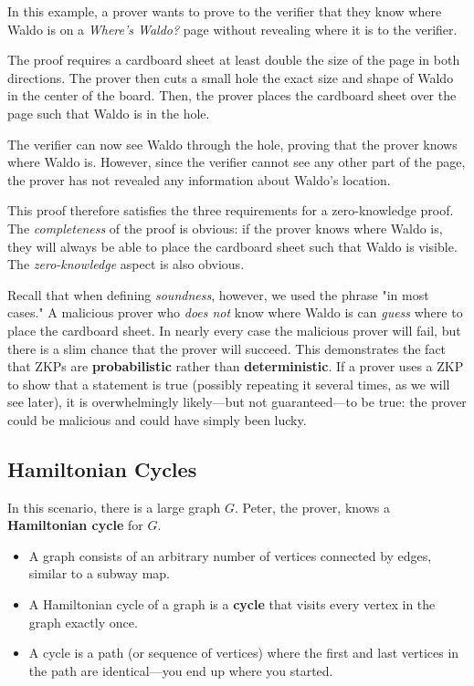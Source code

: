 \documentclass{article}
\begin{document}
\begin{multicols}{2}
In this example, a prover wants to prove to the verifier that they know where Waldo is on a \textit{Where's Waldo?} page without revealing where it is to the verifier.

The proof requires a cardboard sheet at least double the size of the page in both directions. The prover then cuts a small hole the exact size and shape of Waldo in the center of the board. Then, the prover places the cardboard sheet over the page such that Waldo is in the hole.

The verifier can now see Waldo through the hole, proving that the prover knows where Waldo is. However, since the verifier cannot see any other part of the page, the prover has not revealed any information about Waldo's location.

This proof therefore satisfies the three requirements for a zero-knowledge proof. The \textit{completeness} of the proof is obvious: if the prover knows where Waldo is, they will always be able to place the cardboard sheet such that Waldo is visible. The \textit{zero-knowledge} aspect is also obvious.

Recall that when defining \textit{soundness}, however, we used the phrase "in most cases." A malicious prover who \textit{does not} know where Waldo is can \textit{guess} where to place the cardboard sheet. In nearly every case the malicious prover will fail, but there is a slim chance that the prover will succeed. This demonstrates the fact that ZKPs are \textbf{probabilistic} rather than \textbf{deterministic}. If a prover uses a ZKP to show that a statement is true (possibly repeating it several times, as we will see later), it is overwhelmingly likely---but not guaranteed---to be true: the prover could be malicious and could have simply been lucky.

\subsection*{Hamiltonian Cycles}

In this scenario, there is a large graph $G$. Peter, the prover, knows a \textbf{Hamiltonian cycle} for $G$.

\begin{itemize}
    \item A graph consists of an arbitrary number of vertices connected by edges, similar to a subway map.
    \item A Hamiltonian cycle of a graph is a \textbf{cycle} that visits every vertex in the graph exactly once.
    \item A cycle is a path (or sequence of vertices) where the first and last vertices in the path are identical---you end up where you started.
\end{itemize}


\end{multicols}
\end{document}
